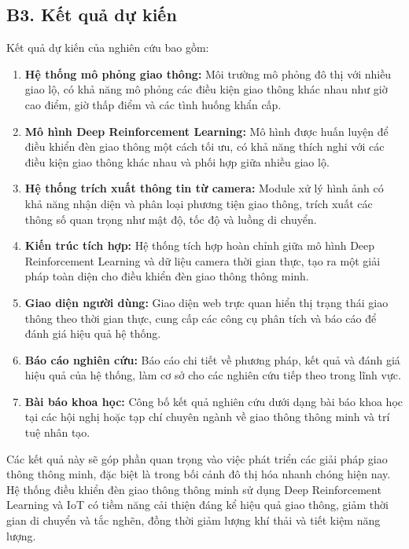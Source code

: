 \documentclass[letterpaper]{article}
\begin{document}
\subsection{B3. Kết quả dự kiến}

Kết quả dự kiến của nghiên cứu bao gồm:

\begin{enumerate}
    \item \textbf{Hệ thống mô phỏng giao thông:} Môi trường mô phỏng đô thị với nhiều giao lộ, có khả năng mô phỏng các điều kiện giao thông khác nhau như giờ cao điểm, giờ thấp điểm và các tình huống khẩn cấp.
    
    \item \textbf{Mô hình Deep Reinforcement Learning:} Mô hình được huấn luyện để điều khiển đèn giao thông một cách tối ưu, có khả năng thích nghi với các điều kiện giao thông khác nhau và phối hợp giữa nhiều giao lộ.
    
    \item \textbf{Hệ thống trích xuất thông tin từ camera:} Module xử lý hình ảnh có khả năng nhận diện và phân loại phương tiện giao thông, trích xuất các thông số quan trọng như mật độ, tốc độ và luồng di chuyển.
    
    \item \textbf{Kiến trúc tích hợp:} Hệ thống tích hợp hoàn chỉnh giữa mô hình Deep Reinforcement Learning và dữ liệu camera thời gian thực, tạo ra một giải pháp toàn diện cho điều khiển đèn giao thông thông minh.
    
    \item \textbf{Giao diện người dùng:} Giao diện web trực quan hiển thị trạng thái giao thông theo thời gian thực, cung cấp các công cụ phân tích và báo cáo để đánh giá hiệu quả hệ thống.
    
    \item \textbf{Báo cáo nghiên cứu:} Báo cáo chi tiết về phương pháp, kết quả và đánh giá hiệu quả của hệ thống, làm cơ sở cho các nghiên cứu tiếp theo trong lĩnh vực.
    
    \item \textbf{Bài báo khoa học:} Công bố kết quả nghiên cứu dưới dạng bài báo khoa học tại các hội nghị hoặc tạp chí chuyên ngành về giao thông thông minh và trí tuệ nhân tạo.
\end{enumerate}

Các kết quả này sẽ góp phần quan trọng vào việc phát triển các giải pháp giao thông thông minh, đặc biệt là trong bối cảnh đô thị hóa nhanh chóng hiện nay. Hệ thống điều khiển đèn giao thông thông minh sử dụng Deep Reinforcement Learning và IoT có tiềm năng cải thiện đáng kể hiệu quả giao thông, giảm thời gian di chuyển và tắc nghẽn, đồng thời giảm lượng khí thải và tiết kiệm năng lượng.
\end{document}
